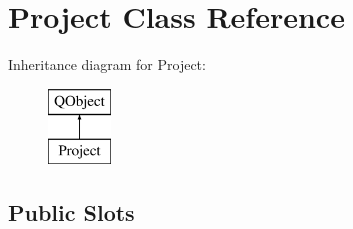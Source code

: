 \hypertarget{class_project}{\section{Project Class Reference}
\label{class_project}
}
Inheritance diagram for Project\-:\begin{figure}[H]
\begin{center}
\leavevmode
\includegraphics[height=2.000000cm]{class_project}
\end{center}
\end{figure}
\subsection*{Public Slots}
